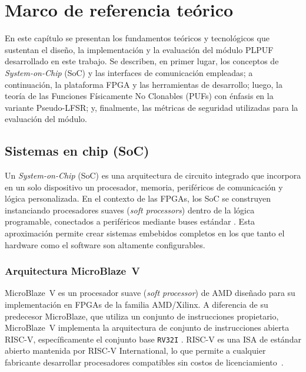 
\chapter{Marco de referencia teórico}
\label{ch:marco}

En este capítulo se presentan los fundamentos teóricos y tecnológicos que
sustentan el diseño, la implementación y la evaluación del módulo PLPUF
desarrollado en este trabajo. Se describen, en primer lugar, los conceptos de
\textit{System-on-Chip} (SoC) y las interfaces de comunicación empleadas; a
continuación, la plataforma FPGA y las herramientas de desarrollo; luego, la
teoría de las Funciones Físicamente No Clonables (PUFs) con énfasis en la
variante Pseudo-LFSR; y, finalmente, las métricas de seguridad utilizadas
para la evaluación del módulo.

\section{Sistemas en chip (SoC)}
\label{sec:soc}

Un \textit{System-on-Chip} (SoC) es una arquitectura de circuito integrado que
incorpora en un solo dispositivo un procesador, memoria, periféricos de
comunicación y lógica personalizada. En el contexto de las FPGAs, los SoC se
construyen instanciando procesadores suaves (\textit{soft processors}) dentro
de la lógica programable, conectados a periféricos mediante buses estándar
\cite{ug994}. Esta aproximación permite crear sistemas embebidos completos en
los que tanto el hardware como el software son altamente configurables.

\subsection{Arquitectura MicroBlaze~V}
\label{sec:microblaze}

MicroBlaze~V es un procesador suave (\textit{soft processor}) de AMD diseñado
para su implementación en FPGAs de la familia AMD/Xilinx. A diferencia de su
predecesor MicroBlaze, que utiliza un conjunto de instrucciones propietario,
MicroBlaze~V implementa la arquitectura de conjunto de instrucciones abierta
RISC-V, específicamente el conjunto base \texttt{RV32I} \cite{ug1629}. RISC-V es una ISA de estándar abierto mantenida por RISC-V
International, lo que permite a cualquier fabricante desarrollar procesadores
compatibles sin costos de licenciamiento~\cite{ug1629}.

